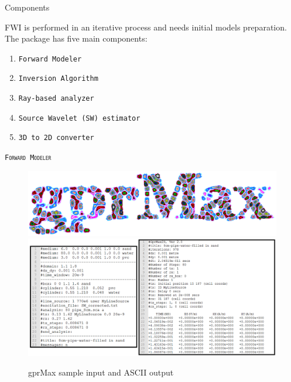 \documentclass[final]{beamer}
\newlength{\onecolwid}
\begin{document}
\begin{frame}[t]
\begin{columns}[t]
\begin{column}{\onecolwid}
\begin{alertblock}{Components}
	
FWI is performed in an iterative process and needs initial models preparation. The package has five main components:
	\begin{enumerate}
		\item \hspace{1cm} \texttt{Forward Modeler}
		\item \hspace{1cm} \texttt{Inversion Algorithm}
		\item \hspace{1cm} \texttt{Ray-based analyzer}
		\item \hspace{1cm} \texttt{Source Wavelet (SW) estimator}
		\item \hspace{1cm} \texttt{3D to 2D converter} 
	\end{enumerate}
	
\end{alertblock}

\vspace*{2cm}

\begin{block}{\textsc{\texttt{Forward Modeler}}}
	
\begin{figure}
	\includegraphics[width=0.7\linewidth]{gprmax.png}
	\vspace{1cm}
	\includegraphics[width=1\linewidth]{gprmax_image.png}
	\caption{gprMax sample input and ASCII output \cite{gprmax}}
\end{figure}
	

\end{block}
\end{column}
\end{columns}
\end{frame}
\end{document}
